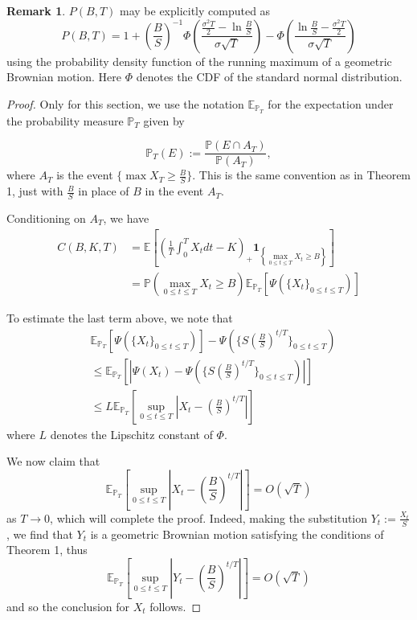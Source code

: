 \documentclass{article}
\theoremstyle{definition}
\newtheorem{remark}[theorem]{Remark}
\theoremstyle{definition}
\begin{document}
\begin{remark} $P(B, T)$ may be explicitly computed as
$$
P(B, T)=1+\left (\frac{B}{S}\right )^{-1} \Phi\left(\frac{\frac{\sigma^{2} T}{2}-\ln \frac{B}{S}}{\sigma \sqrt{T}}\right)-\Phi\left(\frac{\ln \frac{B}{S} -\frac{\sigma^2 T}{2}}{\sigma \sqrt{T}}\right)
$$
using the probability density function of the running maximum of a geometric Brownian motion. Here $\Phi$ denotes the CDF of the standard normal distribution.
\end{remark}
\begin{proof}
Only for this section, we use the notation $\mathbb E_{\mathbb P_T}$ for the expectation under the probability measure $\mathbb P_T$ given by

$$\mathbb P_T (E) := \frac{\mathbb P(E \cap A_T)}{\mathbb P(A_T)},$$
where $A_T$ is the event
$\{\max X_T \geq \frac{B}{S}\}$.
This is the same convention as in Theorem 1, just with $\frac{B}{S}$ in place of $B$ in the event $A_T$.

Conditioning on $A_T$, we have
$$
\begin{aligned}
C(B, K, T) & =\mathbb{E}\left[\left(\frac{1}{T} \int_{0}^{T} X_{t} d t-K\right)_{+} \mathbf{1}_{\left\{\max _{0 \leq t \leq T} X_{t} \geq B\right\}}\right] \\
& =\mathbb{P}\left(\max _{0 \leq t \leq T} X_{t} \geq B\right) \mathbb{E}_{\mathbb{P}_{T}} \left [\Psi(\{X_t\}_{0 \leq t \leq T})\right]
\end{aligned}
$$

To estimate the last term above, we note that
$$
\begin{aligned}
& \mathbb{E}_{\mathbb{P}_{T}}  [\Psi(\{X_t\}_{0 \leq t \leq T})]-\Psi(\{S(\frac{B}{S})^{t/T}\}_{0 \leq t \leq T})\\
& \leq \mathbb{E}_{\mathbb{P}_{T}}\left[ \left |\Psi(X_t) -\Psi(\{S(\frac{B}{S})^{t/T}\}_{0 \leq t \leq T}) \right |\right] \\
& \leq L \mathbb{E}_{\mathbb{P}_{T}}\left[\sup_{0 \leq t \leq T} \left |X_t -(\frac{B}{S})^{t/T} \right |\right] 
\end{aligned}
$$
where $L$ denotes the Lipschitz constant of $\Phi$.  

We now claim that 
$$\mathbb{E}_{\mathbb{P}_{T}}\left[\sup_{0 \leq t \leq T} |X_t -(\frac{B}{S})^{t/T}|\right] = O(\sqrt T)$$
as $T \to 0$, which will complete the proof. Indeed, making the substitution $Y_t := \frac{X_t}{S}$, we find that $Y_t$ is a geometric Brownian motion satisfying the conditions of Theorem 1, thus 
$$\mathbb{E}_{\mathbb{P}_{T}}\left[\sup_{0 \leq t \leq T} |Y_t - (\frac{B}{S})^{t/T}|\right] = O(\sqrt T)$$
and so the conclusion for $X_t$ follows.
\end{proof}
\end{document}

